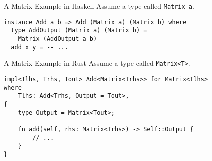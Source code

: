 \documentclass[
  english,            %
  aspectratio=169,    %
]{tumbeamer}
\begin{document}
\begin{frame}[fragile]{A Matrix Example in Haskell}
Assume a type called \texttt{Matrix a}.

\pause \vspace{3mm}

\begin{verbatim}
instance Add a b => Add (Matrix a) (Matrix b) where
  type AddOutput (Matrix a) (Matrix b) =
    Matrix (AddOutput a b)
  add x y = -- ...
\end{verbatim}
\end{frame}

\begin{frame}[fragile]{A Matrix Example in Rust}
Assume a type called \texttt{Matrix<T>}.

\pause \vspace{3mm}

\begin{verbatim}
impl<Tlhs, Trhs, Tout> Add<Matrix<Trhs>> for Matrix<Tlhs>
where
    Tlhs: Add<Trhs, Output = Tout>,
{
    type Output = Matrix<Tout>;

    fn add(self, rhs: Matrix<Trhs>) -> Self::Output {
        // ...
    }
}
\end{verbatim}
\end{frame}





\end{document}

